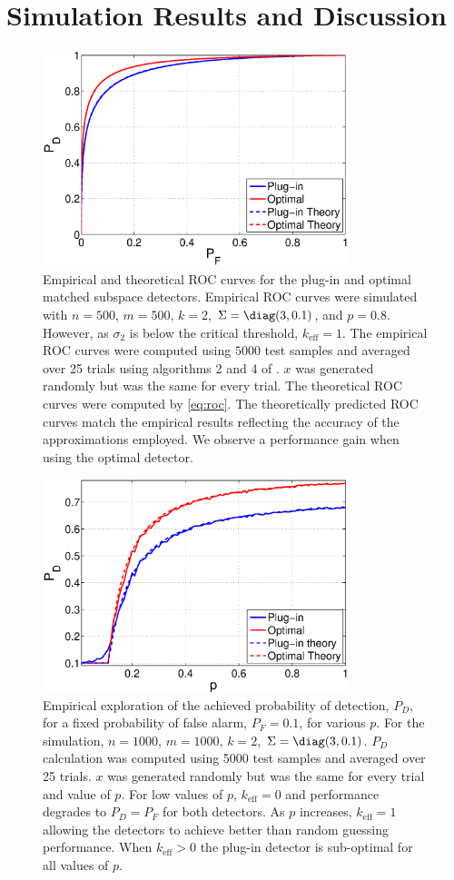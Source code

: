 \section{Simulation Results and Discussion}\label{sec:results}

\begin{figure}
\centering
\includegraphics[width=3.5in]{figures/basic_roc.eps}
\caption{Empirical and theoretical ROC curves for the plug-in and optimal matched subspace detectors. Empirical ROC curves were simulated with $n=500$, $m=500$, $k=2$, $\Sigma=\diag(3,0.1)$, and $p=0.8$. However, as $\sigma_2$ is below the critical threshold, $k_{\text{eff}} = 1$. The empirical ROC curves were computed using $5000$ test samples and averaged over 25 trials using algorithms 2 and 4 of \cite{fawcett2006introduction}. $x$ was generated randomly but was the same for every trial. The theoretical ROC curves were computed by \ref{eq:roc}. The theoretically predicted ROC curves match the empirical results reflecting the accuracy of the approximations employed. We observe a performance gain when using the optimal detector.}\vskip-0.15cm
\label{fig:roc1}
\end{figure}

\begin{figure}
\centering
\includegraphics[width=3.5in]{figures/sparsity.eps}
\caption{Empirical exploration of the achieved probability of detection, $P_D$, for a fixed probability of false alarm, $P_F=0.1$, for various $p$. For the simulation, $n=1000$, $m=1000$, $k=2$, $\Sigma=\diag(3,0.1)$. $P_D$ calculation was computed using 5000 test samples and averaged over 25 trials. $x$ was generated randomly but was the same for every trial and value of $p$. For low values of $p$, $k_\text{eff}=0$ and performance degrades to $P_D=P_F$ for both detectors. As $p$ increases, $k_\text{eff}=1$ allowing the detectors to achieve better than random guessing performance. When $k_\text{eff}>0$ the plug-in detector is sub-optimal for all values of $p$.}\vskip-0.15cm
\label{fig:sparsity}
\end{figure}


